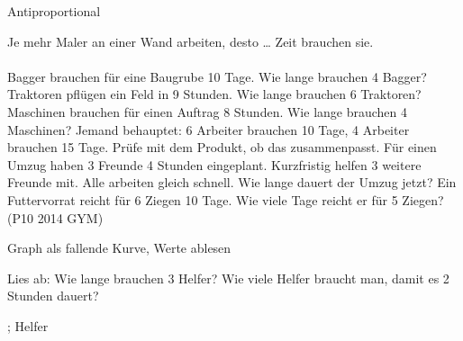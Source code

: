 \setcounter{aufgabe}{19}

\begin{aufgabe}{Antiproportional}
\begin{teile}
\teil Je mehr Maler an einer Wand arbeiten, desto … Zeit brauchen sie. \\  \\ 
 Bagger brauchen für eine Baugrube 10 Tage. Wie lange brauchen 4 Bagger? \leerfeld[Tage]
 Traktoren pflügen ein Feld in 9 Stunden. Wie lange brauchen 6 Traktoren? \leerfeld[h]
 Maschinen brauchen für einen Auftrag 8 Stunden. Wie lange brauchen 4 Maschinen? \leerfeld[h]
\teil Jemand behauptet: 6 Arbeiter brauchen 10 Tage, 4 Arbeiter brauchen 15 Tage. Prüfe mit dem Produkt, ob das zusammenpasst.
\teil Für einen Umzug haben 3 Freunde 4 Stunden eingeplant. Kurzfristig helfen 3 weitere Freunde mit. Alle arbeiten gleich schnell. Wie lange dauert der Umzug jetzt?
\teil Ein Futtervorrat reicht für 6 Ziegen 10 Tage. Wie viele Tage reicht er für 5 Ziegen? \hfill (P10 2014 GYM) \\ \leerfeld[Tage]
\end{teile}
\end{aufgabe}

\begin{aufgabe}{Graph als fallende Kurve, Werte ablesen}
\begin{teile}
\teil Lies ab: Wie lange brauchen 3 Helfer? Wie viele Helfer braucht man, damit es 2 Stunden dauert?

\begin{ksys}[xmin=0,xmax=7,ymin=0,ymax=13,ablesen,xlabel=Anzahl Helfer,ylabel=Zeit in h]\end{ksys}
\leerfeld[h] ; \leerfeld Helfer
\end{teile}
\end{aufgabe}

